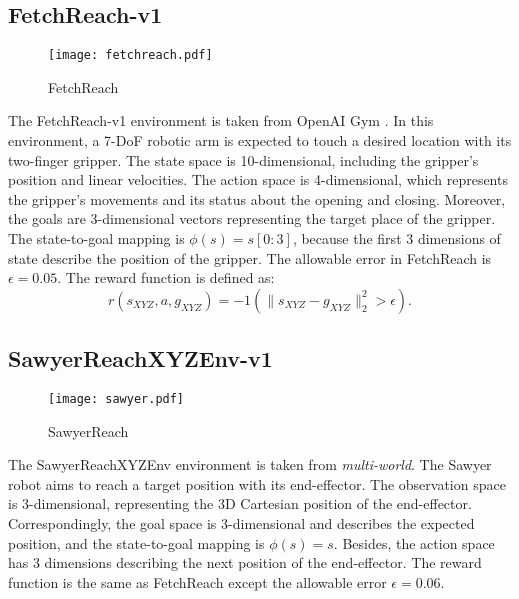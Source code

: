 \documentclass{article}
\begin{document}
\subsection{FetchReach-v1}
\begin{wrapfigure}{r}{2.3cm}
\centering
  \vspace{-10pt}    %
  \texttt{[image: fetchreach.pdf]}\\
  \vspace{-0pt}    %
  \caption*{FetchReach}
  \vspace{0pt}    %
\end{wrapfigure}
The FetchReach-v1 environment is taken from OpenAI Gym \cite{brockman2016openai}. In this environment, a 7-DoF robotic arm is expected to touch a desired location with its two-finger gripper. The state space is 10-dimensional, including the gripper’s position and linear velocities. The action space is 4-dimensional, which represents the gripper’s movements and its status about the opening and closing. Moreover, the goals are 3-dimensional vectors representing the target place of the gripper. The state-to-goal mapping is $\phi(s)=s[0:3]$, because the first $3$ dimensions of state describe the position of the gripper. The allowable error in FetchReach is $\epsilon=0.05$. The reward function is defined as:
\begin{equation*}
    r(s_{XYZ},a,g_{XYZ}) = - 1(\|s_{XYZ}-g_{XYZ} \|_2^2 > \epsilon) .
\end{equation*}

\subsection{SawyerReachXYZEnv-v1}
\begin{wrapfigure}{r}{2.3cm}
\centering
  \vspace{-10pt}    %
  \texttt{[image: sawyer.pdf]}\\
  \vspace{-0pt}    %
  \caption*{SawyerReach}
  \vspace{-8pt}    %
\end{wrapfigure}
The SawyerReachXYZEnv environment is taken from \emph{multi-world}. The Sawyer robot aims to reach a target position with its end-effector. The observation space is 3-dimensional, representing the 3D Cartesian position of the end-effector. Correspondingly, the goal space is 3-dimensional and describes the expected position, and the state-to-goal mapping is $\phi(s)=s$. Besides, the action space has 3 dimensions describing the next position of the end-effector. The reward function is the same as FetchReach except the allowable error $\epsilon=0.06$. 
\end{document}
